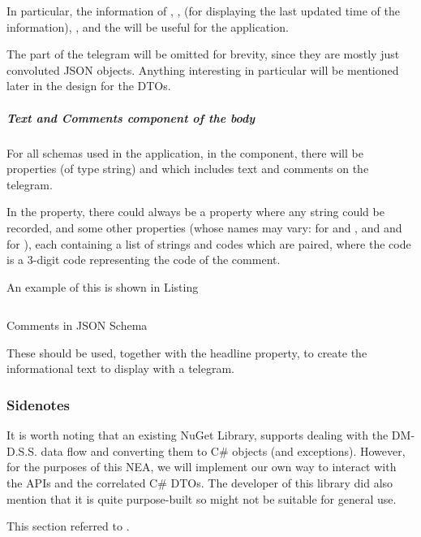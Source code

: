 In particular, the information of , ,  (for displaying the last updated time of the information), ,  and the  will be useful for the application.

The  part of the telegram will be omitted for brevity, since they are mostly just convoluted JSON objects. Anything interesting in particular will be mentioned later in the design for the DTOs.

\subparagraph{Text and Comments component of the body} For all schemas used in the application, in the  component, there will be properties  (of type string) and  which includes text and comments on the telegram.

In the  property, there could always be a  property where any string could be recorded, and some other properties (whose names may vary:  for  and , and  and  for ), each containing a list of strings and codes which are paired, where the code is a 3-digit code representing the code of the comment.

An example of this is shown in Listing

\begin{listing}[htp]
    \inputminted{json}{code/TelegramComments.json}
    \caption{Comments in JSON Schema}
    \label{code:telegram-comments}
\end{listing}

These should be used, together with the headline property, to create the informational text to display with a telegram.

\subsubsection{Sidenotes}

It is worth noting that an existing NuGet Library,  \autocite{soft-dmdata-sharp} supports dealing with the DM-D.S.S. data flow and converting them to C\# objects (and exceptions). However, for the purposes of this NEA, we will implement our own way to interact with the APIs and the correlated C\# DTOs. The developer of this library did also mention that it is quite purpose-built so might not be suitable for general use.

This section referred to \autocite{dmdata-references-api, dmdata-references-json, dmdata-references-oauth, dmdata-references-telegram}.

